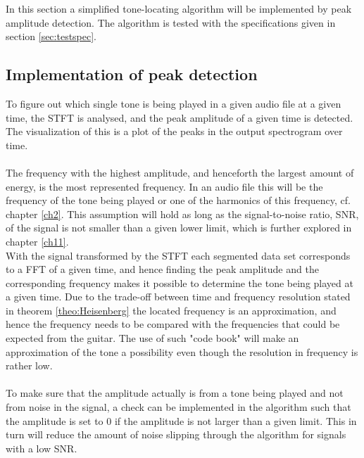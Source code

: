 \label{sec:peak_detection}
In this section a simplified tone-locating algorithm will be implemented by peak amplitude detection.
The algorithm is tested with the specifications given in section \ref{sec:testspec}.
\subsection{Implementation of peak detection}
To figure out which single tone is being played in a given audio file at a given time, the STFT is analysed, and the peak amplitude of a given time is detected.
The visualization of this is a plot of the peaks in the output spectrogram over time.
\\ \\
The frequency with the highest amplitude, and henceforth the largest amount of energy, is the most represented frequency. 
In an audio file this will be the frequency of the tone being played or one of the harmonics of this frequency, cf. chapter \ref{ch2}.
This assumption will hold as long as the signal-to-noise ratio, SNR, of the signal is not smaller than a given lower limit, which is further explored in chapter \ref{ch11}. \\
With the signal transformed by the STFT each segmented data set corresponds to a FFT of a given time, and hence finding the peak amplitude and the corresponding frequency makes it possible to determine the tone being played at a given time. Due to the trade-off between time and frequency resolution stated in theorem \ref{theo:Heisenberg} the located frequency is an approximation, and hence the frequency needs to be compared with the frequencies that could be expected from the guitar.
The use of such "code book" will make an approximation of the tone a possibility even though the resolution in frequency is rather low.
\\ \\
To make sure that the amplitude actually is from a tone being played and not from noise in the signal, a check can be implemented in the algorithm such that the amplitude is set to $0$ if the amplitude is not larger than a given limit.
This in turn will reduce the amount of noise slipping through the algorithm for signals with a low SNR.

